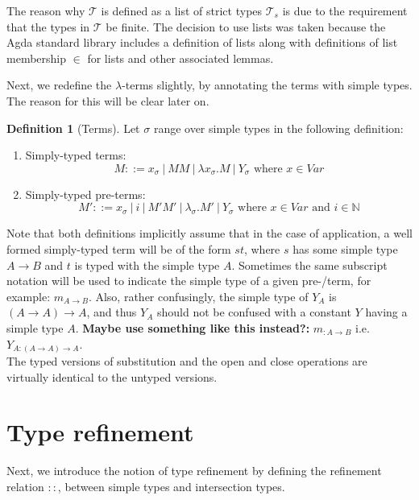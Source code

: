 \documentclass[a4paper, 12pt, twoside]{style/ociamthesis}
\theoremstyle{plain}
\theoremstyle{definition}
\newtheorem{Definition}{Definition}[chapter]
\theoremstyle{remark}
\providecommand{\tightlist}{%
  \setlength{\itemsep}{0pt}\setlength{\parskip}{0pt}}
\begin{document}
The reason why \(\mathcal{T}\) is defined as a list of strict types
\(\mathcal{T}_s\) is due to the requirement that the types in
\(\mathcal{T}\) be finite. The decision to use lists was taken because
the Agda standard library includes a definition of lists along with
definitions of list membership \(\in\) for lists and other associated
lemmas.

Next, we redefine the \(\lambda\)-terms slightly, by annotating the
terms with simple types. The reason for this will be clear later on.

\begin{Definition}[Terms]

Let \(\sigma\) range over simple types in the following definition:

\begin{enumerate}
\def\labelenumi{\roman{enumi})}
\tightlist
\item
  Simply-typed terms:
  \[M::= x_\sigma\ |\ MM\ |\ \lambda x_\sigma.M\ |\ Y_\sigma \text{ where }x \in Var\]
\item
  Simply-typed pre-terms:
  \[M'::= x_\sigma\ |\ i\ |\ M'M'\ |\ \lambda_\sigma.M'\ |\ Y_\sigma \text{ where }x \in Var\text{ and }i \in \mathbb{N}\]
\end{enumerate}

\end{Definition}

Note that both definitions implicitly assume that in the case of
application, a well formed simply-typed term will be of the form \(st\),
where \(s\) has some simple type \(A \to B\) and \(t\) is typed with the
simple type \(A\). Sometimes the same subscript notation will be used to
indicate the simple type of a given pre-/term, for example:
\(m_{A \to B}\). Also, rather confusingly, the simple type of \(Y_A\) is
\((A \to A) \to A\), and thus \(Y_A\) should not be confused with a
constant \(Y\) having a simple type \(A\). \textbf{Maybe use something
like this instead?:} \(m_{:A \to B}\) i.e. \(Y_{A:(A \to A) \to A}\).\\
The typed versions of substitution and the open and close operations are
virtually identical to the untyped versions.

\section{Type refinement}\label{type-refinement}

Next, we introduce the notion of type refinement by defining the
refinement relation \(::\), between simple types and intersection types.
\end{document}
